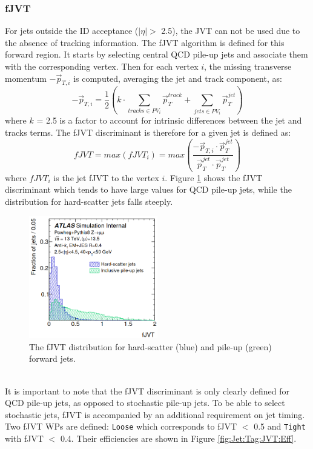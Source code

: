 \subsubsection{fJVT}
\label{Jet:Tag:JVT:fJVT}
For jets outside the ID acceptance ($|\eta|>$ 2.5), the JVT can not be used due to the absence of tracking information. The fJVT algorithm is defined for this forward region. It starts by selecting central QCD pile-up jets and associate them with the corresponding vertex. Then for each vertex $i$, the missing transverse momentum $-\vec{p}_{T, i}$ is computed, averaging the jet and track component, as:
\begin{equation}
    -\vec{p}_{T, i}=\frac{1}{2}\left(k \cdot \sum_{tracks \in P V_{i}} \vec{p}_{T}^{track }+\sum_{jets \in PV_{i}} \vec{p}_{T}^{jet}\right)
\end{equation}
where $k$ = 2.5 is a factor to account for intrinsic differences between the jet and tracks terms. The fJVT discriminant is therefore for a given jet is defined as:
\begin{equation}
    fJVT = max(fJVT_i) = max(\frac{-\vec{p}_{T, i} \cdot \vec{p}_{T}^{j e t}}{\vec{p}_{T}^{j e t} \cdot \vec{p}_{T}^{j e t}})
\end{equation}
where $fJVT_i$ is the jet fJVT to the vertex $i$. Figure \ref{fig:Jet:Tag:JVT:fJVT} shows the fJVT discriminant which tends to have large values for QCD pile-up jets, while the distribution for hard-scatter jets falls steeply.
\begin{figure}[htbp]
    \centering
    \includegraphics[width=0.5\textwidth]{Ch4/Img/fJVT.png}
    \caption{The fJVT distribution for hard-scatter (blue) and pile-up (green) forward jets.}
    \label{fig:Jet:Tag:JVT:fJVT}
\end{figure}
\\
It is important to note that the fJVT discriminant is only clearly defined for QCD pile-up jets, as opposed to stochastic pile-up jets. To be able to select stochastic jets, fJVT is accompanied by an additional requirement on jet timing. Two fJVT WPs are defined: \texttt{Loose} which corresponds to fJVT $<$ 0.5 and \texttt{Tight} with fJVT $<$ 0.4. Their efficiencies are shown in Figure \ref{fig:Jet:Tag:JVT:Eff}.
